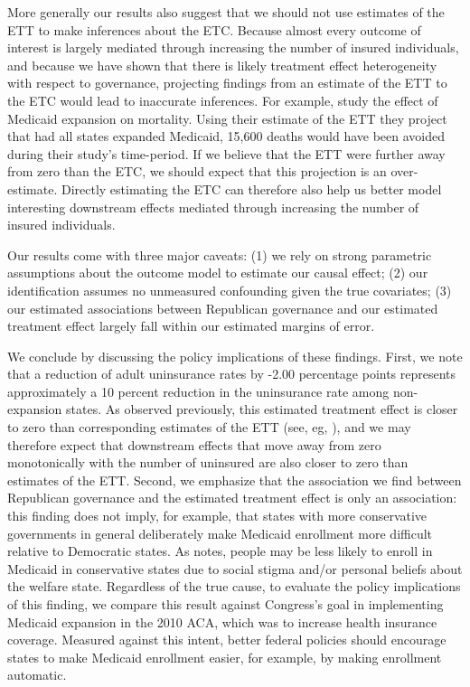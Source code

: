 \documentclass[12pt]{article}
\begin{document}
More generally our results also suggest that we should not use estimates of the ETT to make inferences about the ETC. Because almost every outcome of interest is largely mediated through increasing the number of insured individuals, and because we have shown that there is likely treatment effect heterogeneity with respect to governance, projecting findings from an estimate of the ETT to the ETC would lead to inaccurate inferences. For example, \cite{miller2019medicaid} study the effect of Medicaid expansion on mortality. Using their estimate of the ETT they project that had all states expanded Medicaid, 15,600 deaths would have been avoided during their study's time-period. If we believe that the ETT were further away from zero than the ETC, we should expect that this projection is an over-estimate. Directly estimating the ETC can therefore also help us better model interesting downstream effects mediated through increasing the number of insured individuals. 

Our results come with three major caveats: (1) we rely on strong parametric assumptions about the outcome model to estimate our causal effect; (2) our identification assumes no unmeasured confounding given the true covariates; (3) our estimated associations between Republican governance and our estimated treatment effect largely fall within our estimated margins of error. 

We conclude by discussing the policy implications of these findings. First, we note that a reduction of adult uninsurance rates by -2.00 percentage points represents approximately a 10 percent reduction in the uninsurance rate among non-expansion states. As observed previously, this estimated treatment effect is closer to zero than corresponding estimates of the ETT (see, eg, \cite{courtemanche2017early}), and we may therefore expect that downstream effects that move away from zero monotonically with the number of uninsured are also closer to zero than estimates of the ETT. Second, we emphasize that the association we find between Republican governance and the estimated treatment effect is only an association: this finding does not imply, for example, that states with more conservative governments in general deliberately make Medicaid enrollment more difficult relative to Democratic states. As \cite{sommers2012understanding} notes, people may be less likely to enroll in Medicaid in conservative states due to social stigma and/or personal beliefs about the welfare state. Regardless of the true cause, to evaluate the policy implications of this finding, we compare this result against Congress's goal in implementing Medicaid expansion in the 2010 ACA, which was to increase health insurance coverage. Measured against this intent, better federal policies should encourage states to make Medicaid enrollment easier, for example, by making enrollment automatic. 
\end{document}
